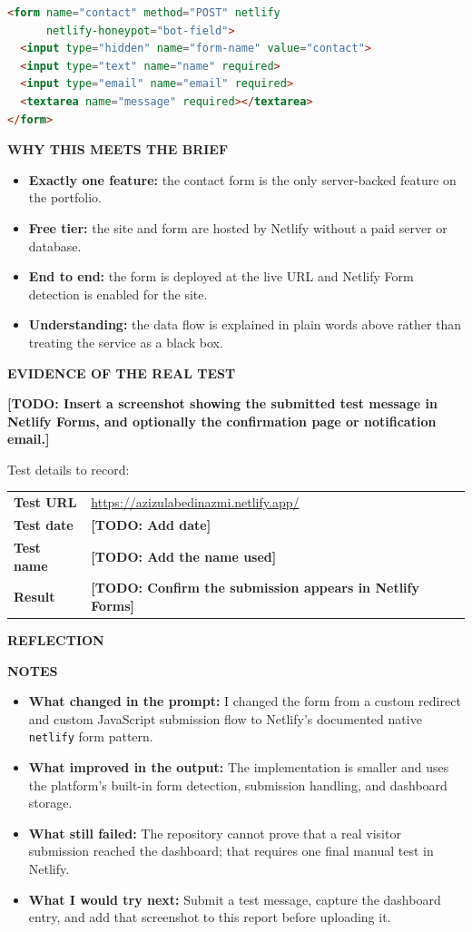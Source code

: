 \documentclass[10pt,a4paper]{article}
\newcommand{\kicker}[1]{{\sffamily\bfseries\small\color{teal}\MakeUppercase{#1}}}
\newcommand{\lbl}[1]{{\sffamily\bfseries\footnotesize\color{muted}\MakeUppercase{#1}}}
\newcommand{\sect}[1]{\needspace{5\baselineskip}\vspace{0.5em}\par\kicker{#1}\par\vspace{-0.5em}{\color{rule}\rule{\linewidth}{0.5pt}}\par\vspace{-0.2em}}
\newcommand{\todo}[1]{{\color{warn}\bfseries[TODO: #1]}}
\newcommand{\notes}[4]{%
\lbl{Notes}\par
\begin{itemize}
  \item \textbf{What changed in the prompt:} #1
  \item \textbf{What improved in the output:} #2
  \item \textbf{What still failed:} #3
  \item \textbf{What I would try next:} #4
\end{itemize}}
\begin{document}
\begin{lstlisting}[language=HTML]
<form name="contact" method="POST" netlify
      netlify-honeypot="bot-field">
  <input type="hidden" name="form-name" value="contact">
  <input type="text" name="name" required>
  <input type="email" name="email" required>
  <textarea name="message" required></textarea>
</form>
\end{lstlisting}

\sect{Why this meets the brief}

\begin{itemize}
  \item \textbf{Exactly one feature:} the contact form is the only
        server-backed feature on the portfolio.
  \item \textbf{Free tier:} the site and form are hosted by Netlify without a
        paid server or database.
  \item \textbf{End to end:} the form is deployed at the live URL and Netlify
        Form detection is enabled for the site.
  \item \textbf{Understanding:} the data flow is explained in plain words
        above rather than treating the service as a black box.
\end{itemize}

\sect{Evidence of the real test}

\todo{Insert a screenshot showing the submitted test message in Netlify
Forms, and optionally the confirmation page or notification email.}

Test details to record:

\begin{tabularx}{\linewidth}{@{}lY@{}}
\toprule
\textbf{Test URL} & \url{https://azizulabedinazmi.netlify.app/}\\
\textbf{Test date} & \todo{Add date}\\
\textbf{Test name} & \todo{Add the name used}\\
\textbf{Result} & \todo{Confirm the submission appears in Netlify Forms}\\
\bottomrule
\end{tabularx}

\sect{Reflection}

\notes
{I changed the form from a custom redirect and custom JavaScript submission
flow to Netlify's documented native \texttt{netlify} form pattern.}
{The implementation is smaller and uses the platform's built-in form
detection, submission handling, and dashboard storage.}
{The repository cannot prove that a real visitor submission reached the
dashboard; that requires one final manual test in Netlify.}
{Submit a test message, capture the dashboard entry, and add that screenshot
to this report before uploading it.}
\end{document}
